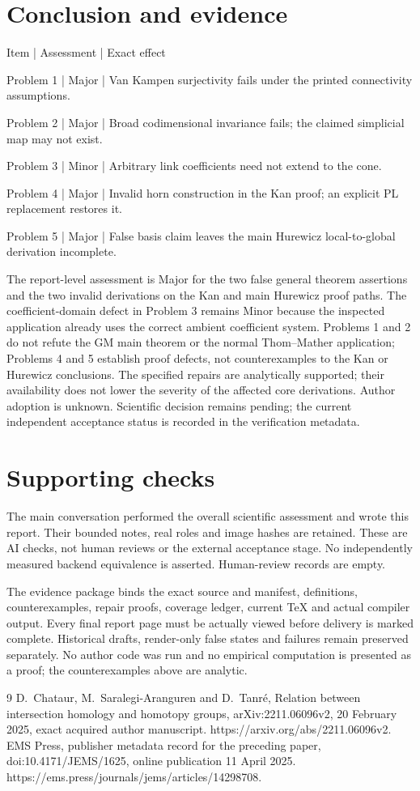 \documentclass[10pt]{article}
\begin{document}
\section*{Conclusion and evidence}
Item | Assessment | Exact effect\par
Problem 1 | Major | Van Kampen surjectivity fails under the printed connectivity assumptions.\par
Problem 2 | Major | Broad codimensional invariance fails; the claimed simplicial map may not exist.\par
Problem 3 | Minor | Arbitrary link coefficients need not extend to the cone.\par
Problem 4 | Major | Invalid horn construction in the Kan proof; an explicit PL replacement restores it.\par
Problem 5 | Major | False basis claim leaves the main Hurewicz local-to-global derivation incomplete.\par
The report-level assessment is Major for the two false general theorem assertions and the two invalid derivations on the Kan and main Hurewicz proof paths. The coefficient-domain defect in Problem 3 remains Minor because the inspected application already uses the correct ambient coefficient system. Problems 1 and 2 do not refute the GM main theorem or the normal Thom–Mather application; Problems 4 and 5 establish proof defects, not counterexamples to the Kan or Hurewicz conclusions. The specified repairs are analytically supported; their availability does not lower the severity of the affected core derivations. Author adoption is unknown. Scientific decision remains pending; the current independent acceptance status is recorded in the verification metadata.\par
\section*{Supporting checks}
The main conversation performed the overall scientific assessment and wrote this report. Their bounded notes, real roles and image hashes are retained. These are AI checks, not human reviews or the external acceptance stage. No independently measured backend equivalence is asserted. Human-review records are empty.\par
The evidence package binds the exact source and manifest, definitions, counterexamples, repair proofs, coverage ledger, current TeX and actual compiler output. Every final report page must be actually viewed before delivery is marked complete. Historical drafts, render-only false states and failures remain preserved separately. No author code was run and no empirical computation is presented as a proof; the counterexamples above are analytic.\par
9 D. Chataur, M. Saralegi-Aranguren and D. Tanré, Relation between intersection homology and homotopy groups, arXiv:2211.06096v2, 20 February 2025, exact acquired author manuscript. https://arxiv.org/abs/2211.06096v2. EMS Press, publisher metadata record for the preceding paper, doi:10.4171/JEMS/1625, online publication 11 April 2025. https://ems.press/journals/jems/articles/14298708.\par
\end{document}
